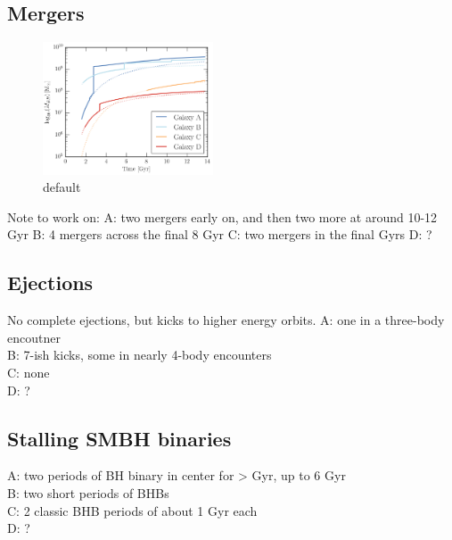 \documentclass[english, apj]{emulateapj}
\begin{document}
\subsection{Mergers}
\begin{figure}[htbp]
\begin{center}
\includegraphics[width=0.45\textwidth]{plots/masses_ABCD.png}
\caption{default}
\label{default4}
\end{center}
\end{figure}



Note to work on:
\noindent A: two mergers early on, and then two more at around 10-12 Gyr
B: 4 mergers across the final 8 Gyr
C: two mergers in the final Gyrs
D: ?


\subsection{Ejections}
No complete ejections, but kicks to higher energy orbits.
\noindent A: one in a three-body encoutner\\
B: 7-ish kicks, some in nearly 4-body encounters\\
C: none\\
D: ?\\

\subsection{Stalling SMBH binaries}
A: two periods of BH binary in center for > Gyr, up to 6 Gyr\\
B: two short periods of BHBs\\
C: 2 classic BHB periods of about 1 Gyr each\\
D: ?
\end{document}
